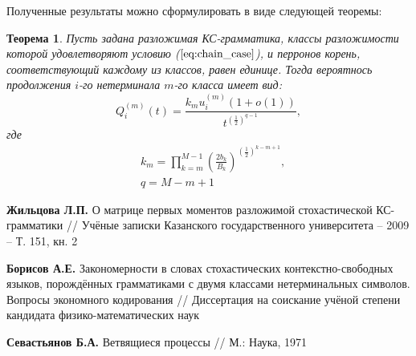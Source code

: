 \documentclass[12pt]{article}
\newtheorem{theorem}{Теорема}
\begin{document}
Полученные результаты можно сформулировать в виде следующей теоремы:
\begin{theorem}
Пусть задана разложимая КС-грамматика, классы разложимости которой удовлетворяют условию \textup{(}$\ref{eq:chain_case}$\textup{)}, и перронов корень, соответствующий каждому из классов, равен единице. Тогда вероятнось продолжения $i$-го нетерминала $m$-го класса имеет вид:
\begin{equation}
	Q^{(m)}_i(t) = \frac{k_m u^{(m)}_i (1+o(1))}{t^{(\frac{1}{2})^{q-1}}},
\end{equation}
где
\begin{align*}
	&k_m = \prod_{k=m}^{M-1} \left(\frac{2b_k}{B_k}\right)^{(\frac{1}{2})^{k-m+1}},\\
	&q = M - m + 1
\end{align*}	
\end{theorem}
\newpage

\begin{thebibliography}{99}

 \textbf{Жильцова Л.П.} О матрице первых моментов разложимой стохастической КС-грамматики // Учёные записки Казанского государственного университета -- 2009 -- Т. 151, кн. 2

 \textbf{Борисов А.Е.} Закономерности в словах стохастических контекстно-свободных языков, порождённых грамматиками с двумя классами нетерминальных символов. Вопросы экономного кодирования // Диссертация на соискание учёной степени кандидата физико-математических наук

 \textbf{Севастьянов Б.А.} Ветвящиеся процессы // М.: Наука, 1971

\end{thebibliography}
\end{document}
